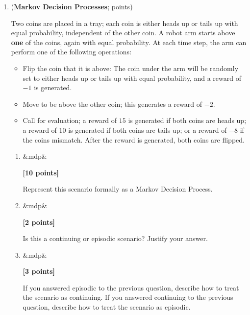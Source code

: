 \documentclass{article}
\newcounter{totalpoints}
\newcommand{\question}[2][]{(\textbf{#2}; \subtotal{#1})}
\newcommand{\subtotal}[1]{\newcounter{#1}\setcounter{#1}{0}\regtotcounter{#1}\total{#1} points}
\newcommand{\points}[2][]{{\addtocounter{totalpoints}{#2}\ifx&#1&\else\addtocounter{#1}{#2}\fi\textbf{[#2 points]}}}
\begin{document}
\clearpage




\begin{enumerate}





\item \question[mdp]{Markov Decision Processes}

Two coins are placed in a tray; each coin is either heads up or tails up with equal probability, independent of the other coin.  A robot arm starts above \textbf{one} of the coins, again with equal probability.  At each time step, the arm can perform one of the following operations:
\begin{itemize}
\item \textsf{Flip} the coin that it is above: The coin under the arm will be randomly set to either heads up or tails up with equal probability, and a reward of $-1$ is generated.
\item \textsf{Move} to be above the other coin; this generates a reward of $-2$.
\item \textsf{Call} for evaluation; a reward of $15$ is generated if both coins are heads up; a reward of $10$ is generated if both coins are tails up; or a reward of $-8$ if the coins mismatch.  After the reward is generated, both coins are flipped.
\end{itemize}
\begin{answer}{0in}
\end{answer}
\begin{enumerate}
\item\points[mdp]{10} \label{q:mdp}
Represent this scenario formally as a Markov Decision Process.

\begin{answer}{2.5in}
\end{answer}

\item\points[mdp]{2}
Is this a continuing or episodic scenario?  Justify your answer.
\begin{answer}{.75in}
\end{answer}

\item\points[mdp]{3}
If you answered episodic to the previous question, describe how to treat the scenario as continuing.
If you answered continuing to the previous question, describe how to treat the scenario as episodic.
\begin{answer}{1in}
\end{answer}
\end{enumerate}


\end{enumerate}
\end{document}
